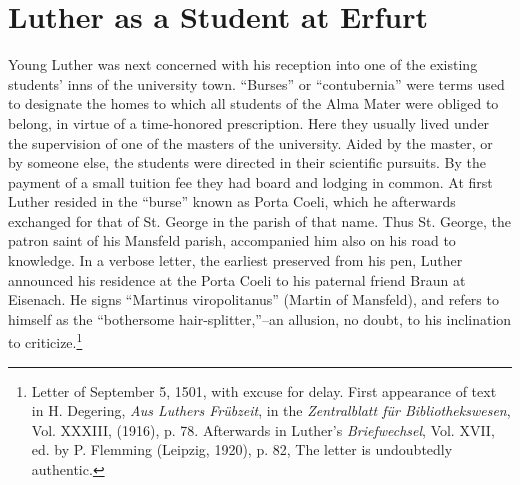 \section{Luther as a Student at Erfurt}

Young Luther was next concerned with his reception into one of
the existing students’ inns of the university town. “Burses” or “contubernia”
were terms used to designate the homes to which all
students of the Alma Mater were obliged to belong, in virtue of
a time-honored prescription. Here they usually lived under the
supervision of one of the masters of the university. Aided by the
master, or by someone else, the students were directed in their scientific pursuits. By the payment of a small tuition fee they had board
and lodging in common. At first Luther resided in the “burse” known
as Porta Coeli, which he afterwards exchanged for that of St. George
in the parish of that name. Thus St. George, the patron saint of his
Mansfeld parish, accompanied him also on his road to knowledge.
In a verbose letter, the earliest preserved from his pen, Luther announced his residence at the Porta Coeli to his paternal friend Braun
at Eisenach. He signs “Martinus viropolitanus” (Martin of Mansfeld),
and refers to himself as the ``bothersome hair-splitter,''--an allusion,
no doubt, to his inclination to criticize.\footnote
{Letter of September 5, 1501, with excuse for delay. First appearance of text in
H. Degering, \textit{Aus Luthers Frübzeit}, in the \textit{Zentralblatt für Bibliothekswesen}, Vol. XXXIII,
(1916), p. 78. Afterwards in Luther’s \textit{Briefwechsel}, Vol. XVII, ed. by P. Flemming (Leipzig, 1920), p. 82, The letter is undoubtedly authentic.}

